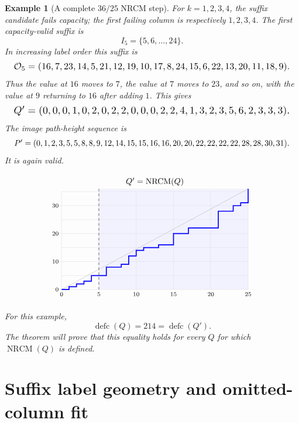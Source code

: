 \documentclass[10pt]{article}
\newtheorem{example}{Example}
\newcommand{\defc}{\operatorname{defc}}
\newcommand{\NRCM}{\operatorname{NRCM}}
\begin{document}
\begin{example}[A complete \(36/25\) NRCM step]
For \(k=1,2,3,4\), the suffix candidate fails capacity; the first failing
column is respectively \(1,2,3,4\).  The first capacity-valid suffix is
\[
  I_5=\{5,6,\ldots,24\}.
\]
In increasing label order this suffix is
\[
\resizebox{.98\textwidth}{!}{$
\mathcal O_5=(16,7,23,14,5,21,12,19,10,17,8,24,15,6,22,13,20,11,18,9).
$}
\]
Thus the value at \(16\) moves to \(7\), the value at \(7\) moves to \(23\),
and so on, with the value at \(9\) returning to \(16\) after adding \(1\).
This gives
\[
\resizebox{.98\textwidth}{!}{$
Q'=(0,0,0,1,0,2,0,2,2,0,0,0,2,2,4,1,3,2,3,5,6,2,3,3,3).
$}
\]
The image path-height sequence is
\[
\resizebox{.98\textwidth}{!}{$
P'=(0,1,2,3,5,5,8,8,9,12,14,15,15,16,16,20,20,22,22,22,22,28,28,30,31).
$}
\]
It is again valid.

\[
\begin{tikzpicture}[x=.32cm,y=.12cm]
  \fill[blue!5] (5,0) rectangle (25,36);
  \draw[gray!25,step=5] (0,0) grid (25,35);
  \draw[gray!60] (0,0) -- (25,36);
  \draw[dashed] (5,0) -- (5,36);
  \draw[very thick,blue]
    (0,0) -- (1,0) -- (1,1) -- (2,1) -- (2,2) -- (3,2) -- (3,3)
    -- (4,3) -- (4,5) -- (5,5) -- (5,5) -- (6,5) -- (6,8)
    -- (7,8) -- (7,8) -- (8,8) -- (8,9) -- (9,9) -- (9,12)
    -- (10,12) -- (10,14) -- (11,14) -- (11,15) -- (12,15)
    -- (12,15) -- (13,15) -- (13,16) -- (14,16) -- (14,16)
    -- (15,16) -- (15,20) -- (16,20) -- (16,20) -- (17,20)
    -- (17,22) -- (18,22) -- (18,22) -- (19,22) -- (19,22)
    -- (20,22) -- (20,22) -- (21,22) -- (21,28) -- (22,28)
    -- (22,28) -- (23,28) -- (23,30) -- (24,30) -- (24,31)
    -- (25,31) -- (25,36);
  \node[below] at (0,0) {\scriptsize 0};
  \node[below] at (5,0) {\scriptsize 5};
  \node[below] at (10,0) {\scriptsize 10};
  \node[below] at (15,0) {\scriptsize 15};
  \node[below] at (20,0) {\scriptsize 20};
  \node[below] at (25,0) {\scriptsize 25};
  \node[left] at (0,0) {\scriptsize 0};
  \node[left] at (0,10) {\scriptsize 10};
  \node[left] at (0,20) {\scriptsize 20};
  \node[left] at (0,30) {\scriptsize 30};
  \node[above] at (12.5,36) {\(Q'=\NRCM(Q)\)};
\end{tikzpicture}
\]

For this example,
\[
  \defc(Q)=214=\defc(Q').
\]
The theorem will prove that this equality holds for every \(Q\) for which
\(\NRCM(Q)\) is defined.
\end{example}

\section{Suffix label geometry and omitted-column fit}
\end{document}
